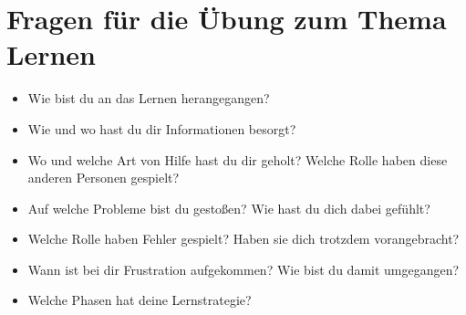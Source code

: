 \section{Fragen für die Übung zum Thema Lernen}
\begin{itemize}
    \item Wie bist du an das Lernen herangegangen?
    \item Wie und wo hast du dir Informationen besorgt?
    \item Wo und welche Art von Hilfe hast du dir geholt? Welche Rolle haben diese anderen Personen gespielt?
    \item Auf welche Probleme bist du gestoßen? Wie hast du dich dabei gefühlt?
    \item Welche Rolle haben Fehler gespielt? Haben sie dich trotzdem vorangebracht?
    \item Wann ist bei dir Frustration aufgekommen? Wie bist du damit umgegangen?
    \item Welche Phasen hat deine Lernstrategie?
\end{itemize}
